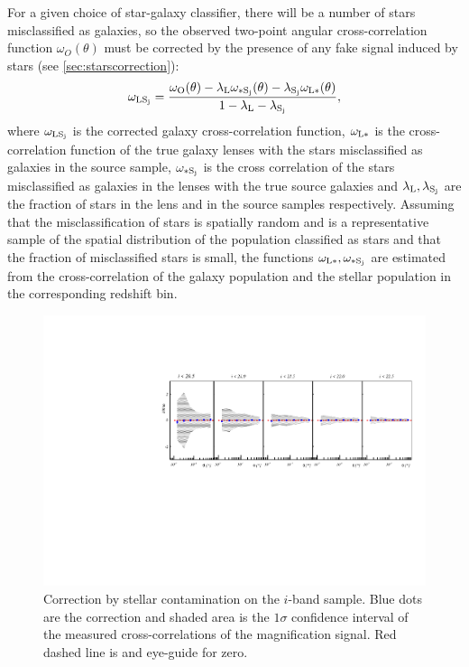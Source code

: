 	For a given choice of star-galaxy classifier, there will be a number of stars misclassified as galaxies, so the observed two-point angular cross-correlation function $\omega_O(\theta)$ must be corrected by the presence of any fake signal induced by stars (see \cref{sec:starscorrection}):
	\begin{equation}
	\omega_{\rm LS_j} = \frac{\omega_{\rm O}(\theta)-\lambda_{\rm L}\omega_{\rm *S_j}(\theta)-\lambda_{\rm S_j}\omega_{\rm L*}(\theta)}{1-\lambda_{\rm L}-\lambda_{\rm S_j}},
	\label{eq:starcorrection}
	\end{equation}
	where $\omega_{\rm LS_j}$ is the corrected galaxy cross-correlation function, $\omega_{\rm L*}$ is the cross-correlation function of the true galaxy lenses with the stars misclassified as galaxies in the source sample, $\omega_{\rm *S_j}$ is the cross correlation of the stars misclassified as galaxies in the lenses with the true source galaxies and $\lambda_{\rm L},\lambda_{\rm S_j}$ are the fraction of stars in the lens and in the source samples respectively.
	Assuming that the misclassification of stars is spatially random and is a representative sample of the spatial distribution of the population classified as stars and that the fraction of misclassified stars is small, the functions $\omega_{\rm L*},\omega_{\rm *S_j}$ are estimated from the cross-correlation of the galaxy population and the stellar population in the corresponding redshift bin.
    \begin{figure}
\includegraphics[width=\textwidth,trim={0 2.3cm 0 3.5cm},clip]{./figures/mag_istars.pdf}
\caption{Correction by stellar contamination on the $i$-band sample. Blue dots are the correction and shaded area is the $1\sigma$ confidence interval of the measured cross-correlations of the magnification signal. Red dashed line is and eye-guide for zero.}
\label{fig:correction}
\end{figure}
\newline
 
